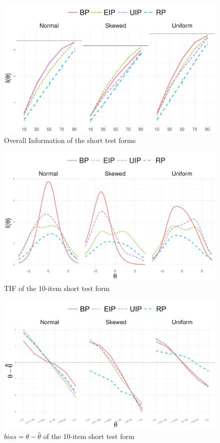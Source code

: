 \documentclass[aspectratio=149, compress]{beamer}
\begin{document}
\begin{frame}
	\begin{figure}
		\centering
		\includegraphics[width=.80\linewidth]{img/info.pdf}
		\caption{Overall Information of the short test forms}
	\end{figure}
\end{frame}


\begin{frame}
	\begin{figure}
		\centering
		\includegraphics[width=.80\linewidth]{img/infoDetails.pdf}
		\caption{TIF of the 10-item short test form}
	\end{figure}
\end{frame}

\begin{frame}
	\begin{figure}
		\centering
		\includegraphics[width=.80\linewidth]{img/BIAS.pdf}
		\caption{$bias = \theta - \hat{\theta}$ of the 10-item short test form}
	\end{figure}
\end{frame}
\end{document}
